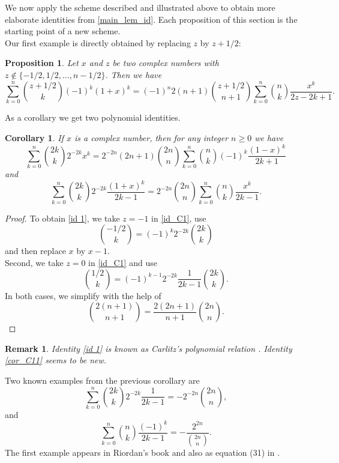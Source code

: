 \documentclass[11pt,reqno]{amsart}
\theoremstyle{plain}
\numberwithin{equation}{section}
\newtheorem{proposition}[thm]{Proposition}
\newtheorem{corollary}[thm]{Corollary}
\newtheorem{remark}[thm]{Remark}
\begin{document}
We now apply the scheme described and illustrated above to obtain more elaborate identities from \eqref{main_lem_id}. 
Each proposition of this section is the starting point of a new scheme.\\

Our first example is directly obtained by replacing $z$ by $z+1/2$:
\begin{proposition}
Let $x$ and $z$ be two complex numbers with $z\notin\{-1/2,1/2,\ldots,n-1/2\}$. Then we have
\begin{equation}\label{id_C1}
\sum_{k=0}^n \binom{z+1/2}{k} (-1)^k (1+x)^k= (-1)^n 2(n+1) \binom{z+1/2}{n+1}\sum_{k=0}^n \binom{n}{k} \frac{x^k}{2z-2k+1}.
\end{equation}
\end{proposition}

As a corollary we get two polynomial identities.

\begin{corollary}\label{polynomial1}
If $x$ is a complex number, then for any integer $n\ge 0$ we have
\begin{equation}\label{id 1}
\sum_{k=0}^n \binom{2k}{k} 2^{-2k} x^k = 2^{-2n} (2n+1) \binom{2n}{n} \sum_{k=0}^n \binom{n}{k} (-1)^k \frac{(1-x)^k}{2k+1}
\end{equation}
and
\begin{equation}\label{cor_C11}
\sum_{k=0}^n \binom{2k}{k} 2^{-2k} \frac{(1+x)^k}{2k-1} = 2^{-2n} \binom{2n}{n} \sum_{k=0}^n \binom{n}{k} \frac{x^k}{2k-1}.
\end{equation}
\end{corollary}
\begin{proof}
To obtain \eqref{id 1}, we take $z=-1$ in \eqref{id_C1}, use 
$$\binom{-1/2}{k}=(-1)^k 2^{-2k}\binom{2k}{k}$$ 
and then replace $x$ by $x-1$. \\
Second, we take $z=0$ in \eqref{id_C1} and use 
$$\binom{1/2}{k}=(-1)^{k-1}2^{-2k}\frac{1}{2k-1}\binom{2k}{k}.$$ 
In both cases, we simplify with the help of
$$\binom{2(n+1)}{n+1} = \frac{2(2n+1)}{n+1} \binom{2n}{n}.$$
\end{proof}

\begin{remark}
Identity \eqref{id 1} is known as Carlitz's polynomial relation \cite{Carlitz}. Identity \eqref{cor_C11} seems to be new.
\end{remark}

Two known examples from the previous corollary are
$$\sum_{k=0}^n \binom{2k}{k} 2^{-2k} \frac{1}{2k-1} = -2^{-2n} \binom{2n}{n},$$
and
$$\sum_{k=0}^n \binom{n}{k} \frac{(-1)^k}{2k-1} = - \frac{2^{2n}}{\binom{2n}{n}}.$$
The first example appears in Riordan's book \cite[p. 130]{Riordan} and also as equation (31) in \cite{Adegoke}. \\
\end{document}
